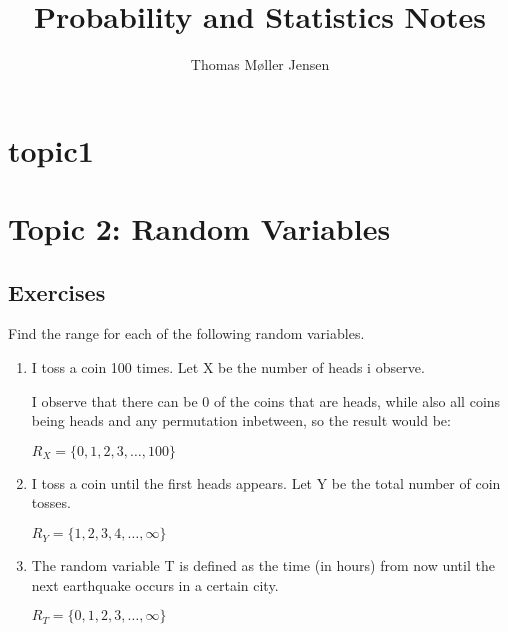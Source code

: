 \documentclass{article}
\title{Probability and Statistics Notes}
\author{Thomas Møller Jensen}
\begin{document}
\maketitle
\section*{topic1}
\section*{Topic 2: Random Variables}
\subsection*{Exercises}
Find the range for each of the following random variables.

	\begin{enumerate}
		\item I toss a coin 100 times. Let X be the number of heads i observe.
	
		I observe that there can be 0 of the coins that are heads, while also all coins being heads and any permutation inbetween, so the result would be:

		$R_X=\{0,1,2,3, \ldots, 100\}$
	
		\item I toss a coin until the first heads appears. Let Y be the total number of coin tosses.

		$R_Y=\{1,2,3,4,\ldots, \infty\}$

		\item The random variable T is defined as the time (in hours) from now until the next earthquake occurs in a certain city.

		$R_T=\{0,1,2,3, \ldots, \infty\}$
	\end{enumerate}
\end{document}
